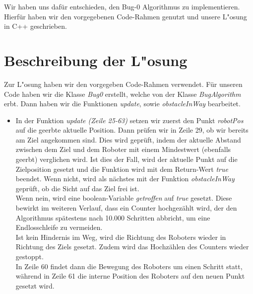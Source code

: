 \documentclass[a4paper]{scrartcl}
\begin{document}
Wir haben uns dafür entschieden, den Bug-0 Algorithmus zu implementieren. Hierfür haben wir den vorgegebenen Code-Rahmen genutzt und unsere L"osung in C++ geschrieben.

\section*{Beschreibung der L"osung}

Zur L"osung haben wir den vorgegeben Code-Rahmen verwendet. Für unseren Code haben wir die Klasse \textit{Bug0} erstellt, welche von der Klasse \textit{BugAlgorithm} erbt. Dann haben wir die Funktionen \textit{update}, sowie \textit{obstacleInWay} bearbeitet.\\
\begin{itemize}
\item In der Funktion \textit{update (Zeile 25-63)} setzen wir zuerst den Punkt \textit{robotPos} auf die geerbte aktuelle Position. Dann prüfen wir in Zeile 29, ob wir bereits am Ziel angekommen sind. Dies wird geprüft, indem der aktuelle Abstand zwischen dem Ziel und dem Roboter mit einem Mindestwert (ebenfalls geerbt) verglichen wird. Ist dies der Fall, wird der aktuelle Punkt auf die Zielposition gesetzt und die Funktion wird mit dem Return-Wert \textit{true} beendet. Wenn nicht, wird als nächstes mit der Funktion \textit{obstacleInWay} geprüft, ob die Sicht auf das Ziel frei ist. \\
Wenn nein, wird eine boolean-Variable \textit{getroffen} auf \textit{true} gesetzt. Diese bewirkt im weiteren Verlauf, dass ein Counter hochgezählt wird, der den Algorithmus spätestens nach 10.000 Schritten abbricht, um eine Endlosschleife zu vermeiden. \\
Ist kein Hindernis im Weg, wird die Richtung des Roboters wieder in Richtung des Ziels gesetzt. Zudem wird das Hochzählen des Counters wieder gestoppt.\\

In Zeile 60 findet dann die Bewegung des Roboters um einen Schritt statt, während in Zeile 61 die interne Position des Roboters auf den neuen Punkt gesetzt wird.


\end{itemize}
\end{document}
